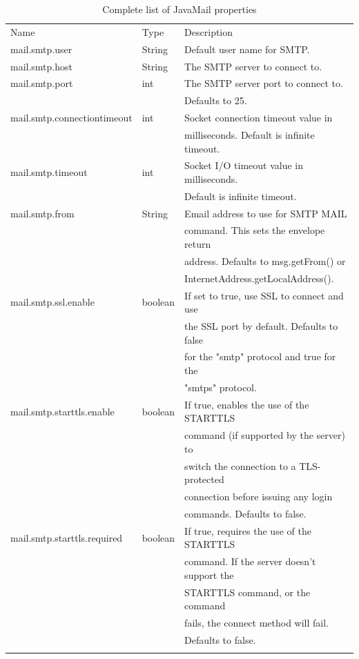 \documentclass[envcountsame,envcountchap]{svmono}
\begin{document}
\begin{table}
\centering
\caption{Complete list of JavaMail properties}
\label{tab:javamail-properties}
\begin{tabular}{lll}
\hline\noalign{\smallskip}
Name & Type & Description  \\
\noalign{\smallskip}\hline\noalign{\smallskip}
mail.smtp.user & String & Default user name for SMTP. \\
mail.smtp.host & String & The SMTP server to connect to. \\
mail.smtp.port & int & The SMTP server port to connect to.\\ & & Defaults to 25. \\
mail.smtp.connectiontimeout & int & Socket connection timeout value in \\ & & milliseconds. Default is infinite timeout.\\
mail.smtp.timeout & int & Socket I/O timeout value in milliseconds. \\ & & Default is infinite timeout. \\
mail.smtp.from & String & Email address to use for SMTP MAIL \\ & & command. This sets the envelope return \\ & & address. Defaults to msg.getFrom() or \\ & & InternetAddress.getLocalAddress(). \\
mail.smtp.ssl.enable & boolean & If set to true, use SSL to connect and use \\ & & the SSL port by default. Defaults to false \\ & & for the "smtp" protocol and true for the \\ & & "smtps" protocol. \\
mail.smtp.starttls.enable & boolean & If true, enables the use of the STARTTLS\\ & & command (if supported by the server) to\\ & & switch the connection to a TLS-protected\\ & & connection before issuing any login\\ & & commands. Defaults to false. \\
mail.smtp.starttls.required & boolean & If true, requires the use of the STARTTLS \\ & & command. If the server doesn't support the \\ & & STARTTLS command, or the command \\ & & fails, the connect method will fail. \\ & &Defaults to false. \\
\noalign{\smallskip}\hline
\end{tabular}
\end{table}

\backmatter

\printindex
\end{document}
